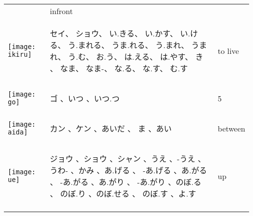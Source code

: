 \documentclass[a4paper,12pt]{extarticle}
\begin{document}
\begin{longtable}{|lp{6cm}p{4cm}|}
&
infront
\\ 
\begin{minipage}{0.3\textwidth}
\centerline{
	\texttt{[image: ikiru]}
}
\end{minipage}
&
\begin{CJK}{UTF8}{min} セイ、 ショウ、 い.きる、 い.かす、 い.ける、 う.まれる、 うま.れる、 う.まれ、 うまれ、 う.む、 お.う、 は.える、 は.やす、 き 、 なま、 なま-、 な.る、 な.す、 む.す\end{CJK}
&
 to live
\\ 
\begin{minipage}{0.3\textwidth}
\centerline{
	\texttt{[image: go]}
}
\end{minipage}
&
\begin{CJK}{UTF8}{min} ゴ 、いつ 、いつ.つ\end{CJK}
&
 5
\\ 
\begin{minipage}{0.3\textwidth}
\centerline{
	\texttt{[image: aida]}
}
\end{minipage}
&
\begin{CJK}{UTF8}{min} カン 、ケン 、あいだ 、 ま 、あい\end{CJK}
&
 between
\\ 
\begin{minipage}{0.3\textwidth}
\centerline{
	\texttt{[image: ue]}
}
\end{minipage}
&
\begin{CJK}{UTF8}{min} ジョウ 、ショウ 、シャン 、うえ 、-うえ  、うわ- 、かみ 、あ.げる 、 -あ.げる 、あ.がる 、 -あ.がる 、あ.がり 、 -あ.がり 、のぼ.る 、 のぼ.り 、のぼ.せる 、 のぼ.す 、よ.す\end{CJK}
&
 up
\\ 
\begin{minipage}{0.3\textwidth}

\end{minipage}
\end{longtable}
\end{document}
